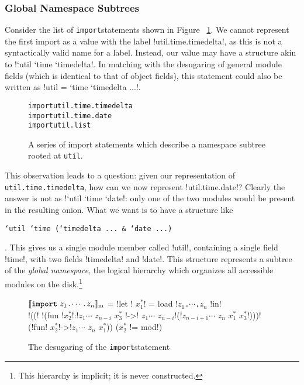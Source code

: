 \documentclass{article}
\newcommand{\lbimport}{\texttt{import}\;}
\newcommand{\moddot}{\texttt{.}}
\newcommand{\translate}[2]{\ensuremath{\llbracket\texttt{#2}\rrbracket_{\textnormal{#1}}}}
\newcommand{\fresh}[1]{\ensuremath{x^*_{#1}}}
\begin{document}
\subsubsection{Global Namespace Subtrees}
\label{sss-glob-name-subtr}
\indent Consider the list of \lbimport statements shown in Figure ~\ref{fig-mod-import-subtree}. We cannot represent the first import as a value with the label \bt\lbil!util.time.timedelta!, as this is not a syntactically valid name for a label. Instead, our value may have a structure akin to \lbil!`util `time `timedelta!. In matching with the desugaring of general module fields (which is identical to that of object fields), this statement could also be written as \lbil!util = `time `timedelta ...!.\\
\begin{figure}[h]
\lbimport \texttt{util.time.timedelta}\\
\lbimport \texttt{util.time.date}\\
\lbimport \texttt{util.list}
\caption{A series of import statements which describe a namespace subtree rooted at \texttt{util}.}
\label{fig-mod-import-subtree}
\end{figure}
\indent This observation leads to a question: given our representation of\\ \texttt{util.time.timedelta}, how can we now represent \lbil!util.time.date!? Clearly the answer is not as \lbil!`util `time `date!: only one of the two modules would be present in the resulting onion. What we want is to have a structure like \begin{small}\texttt{`util `time (`timedelta ... \& `date ...)}\end{small}. This gives us a single module member called \lbil!util!, containing a single field \lbil!time!, with two fields \lbil!timedelta! and \lbil!date!. This structure represents a subtree of the \emph{global namespace}, the logical hierarchy which organizes all accessible modules on the disk.\footnote{This hierarchy is implicit; it is never constructed.}\\
\begin{figure}[h]
\translate{m}{\lbimport $z_1$\moddot$\cdots$\moddot$z_n$} = \lbil!let ! \fresh{1}\lbil! = load !$z_1$\moddot$\cdots$\moddot$z_n$ \lbil!in! \\
\lbil!((! \lbil!(fun !\fresh{2}\lbil!:!\bt $z_1\cdots$ \bt $z_{n-i}$ \fresh{3} \lbil!->! \bt $z_1\cdots$ \bt $z_{n-i}$\lbil!(!\bt $z_{n-i+1}\cdots$ \bt $z_n$ \fresh{1} \lbonion \fresh{3}\lbil!)))!\\
\lbonion (\lbil!fun! \fresh{2}\lbil!->!\bt $z_1\cdots$ \bt $z_n$ \fresh{1})) (\fresh{2} \lbil!= mod!)

\caption{The desugaring of the \lbimport statement}
\label{fig-mod-import-trans}
\end{figure}
\end{document}
